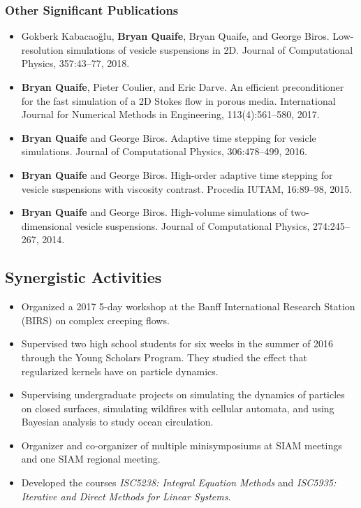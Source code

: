 \documentclass[11pt]{article}
\begin{document}
\subsubsection{Other Significant Publications}
\begin{itemize}[noitemsep,topsep=0pt,parsep=0pt,partopsep=0pt] 

\item Gokberk Kabacao\u{g}lu, {\bf Bryan Quaife}, Bryan Quaife, and
  George Biros.  Low-resolution simulations of vesicle suspensions in
  2D. Journal of Computational Physics, 357:43--77, 2018.

\item {\bf Bryan Quaife}, Pieter Coulier, and Eric Darve. An efficient
  preconditioner for the fast simulation of a 2D Stokes flow in porous
  media. International Journal for Numerical Methods in Engineering,
  113(4):561--580, 2017. 

\item {\bf Bryan Quaife} and George Biros. Adaptive time stepping for
  vesicle simulations. Journal of Computational Physics, 306:478--499,
  2016.

\item {\bf Bryan Quaife} and George Biros. High-order adaptive time
  stepping for vesicle suspensions with viscosity contrast. Procedia
  IUTAM, 16:89–98, 2015. 

\item {\bf Bryan Quaife} and George Biros.  High-volume simulations of
  two-dimensional vesicle suspensions.  Journal of Computational
  Physics, 274:245--267, 2014.
\end{itemize}

\subsection{Synergistic Activities}
\begin{itemize}[noitemsep,topsep=0pt,parsep=0pt,partopsep=0pt] 
  \item Organized a 2017 5-day workshop at the Banff International
    Research Station (BIRS) on complex creeping flows.

  \item Supervised two high school students for six weeks in the summer
    of 2016 through the Young Scholars Program.  They studied the effect
    that regularized kernels have on particle dynamics. 
  
  \item Supervising undergraduate projects on simulating the dynamics of
    particles on closed surfaces, simulating wildfires with cellular
    automata, and using Bayesian analysis to study ocean circulation.

  \item Organizer and co-organizer of multiple minisymposiums at SIAM
    meetings and one SIAM regional meeting.

  \item Developed the courses {\em ISC5238: Integral Equation Methods}
    and {\em ISC5935: Iterative and Direct Methods for Linear Systems}. 

\end{itemize}
\end{document}
